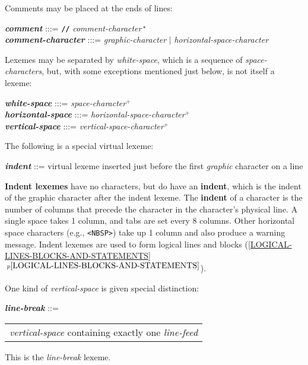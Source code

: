 \documentclass[12pt]{article}
\newcommand{\TT}[1]{{\tt \bfseries #1}}
\newcommand{\PLUS}[1][]{{$^{+#1}$}}
\newcommand{\key}[1]{{\rm \bfseries #1}}
\newcommand{\emkey}[1]{{\em \bfseries #1}}
\newcommand{\ikey}[2]{{\rm \bfseries #1}}
\newcommand{\itemref}[1]{\ref{#1}$\,^{p\pageref{#1}}$}
\newenvironment{indpar}[1][0.3in]%
	{\begin{list}{}%
		     {\setlength{\itemsep}{0in}%
		      \setlength{\topsep}{0in}%
		      \setlength{\parsep}{1ex}%
		      \setlength{\labelwidth}{#1}%
		      \setlength{\leftmargin}{#1}%
		      \addtolength{\leftmargin}{\labelsep}}%
	 \item}%
	{\end{list}}
\begin{document}
Comments may be placed at the ends of lines:
\begin{indpar}
\emkey{comment}\label{COMMENT} :::=
    \TT{//} {\em comment-character}\,$^\star$
\\[1ex]
\emkey{comment-character} :::= {\em graphic-character}
                          $|$ {\em horizontal-space-character}
\end{indpar}

Lexemes may be separated by {\em white-space}, which
is a sequence of {\em space-characters},
but, with some exceptions mentioned just below, is not itself a lexeme:
\begin{indpar}
\emkey{white-space} :::= {\em space-character}\PLUS{}
\\[0.3ex]
\emkey{horizontal-space} :::= {\em horizontal-space-character}\PLUS{}
\\[0.3ex]
\emkey{vertical-space} :::= {\em vertical-space-character}\PLUS{}
\end{indpar}

The following is a special virtual lexeme:
\begin{indpar}
\emkey{indent}\label{INDENT} ::=
        virtual lexeme inserted just before the first
	{\em graphic} character on a line
\end{indpar}

\ikey{Indent lexemes}{indent lexeme} have no characters, but
do have an \key{indent}, which is the indent of
the graphic character after the indent lexeme.
The \key{indent} of a character is the number
of columns that precede the character in the character's physical line.
A single space takes 1 column, and tabs are set every 8 columns.
Other horizontal space characters (e.g., {\tt <NBSP>}) take up 1 column and also
produce a warning message.
Indent lexemes are used to form logical lines and blocks
(\itemref{LOGICAL-LINES-BLOCKS-AND-STATEMENTS}).

One kind of {\em vertical-space} is given special distinction:
\begin{indpar}
\emkey{line-break}\label{LINE-BREAK} ::=
	\begin{tabular}[t]{l}
        {\em vertical-space} containing exactly one {\em line-feed}
	\end{tabular}
\end{indpar}

This is the {\em line-break} lexeme.
\end{document}
